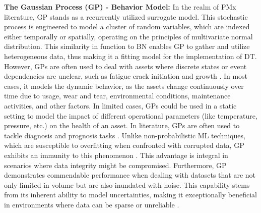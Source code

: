 \documentclass[runningheads]{llncs}
\begin{document}
\textbf{The Gaussian Process (GP) - Behavior Model:} In the realm of PMx literature, GP stands as a recurrently utilized surrogate model. This stochastic process is engineered to model a cluster of random variables, which are indexed either temporally or spatially, operating on the principles of multivariate normal distribution. This similarity in function to BN enables GP to gather and utilize heterogeneous data, thus making it a fitting model for the implementation of DT. However, GPs are often used to deal with assets where discrete states or event dependencies are unclear, such as fatigue crack initiation and growth \cite{fang2022fatigue}. In most cases, it models the dynamic behavior, as the assets change continuously over time due to usage, wear and tear, environmental conditions, maintenance activities, and other factors. In limited cases, GPs could be used in a static setting to model the impact of different operational parameters (like temperature, pressure, etc.) on the health of an asset. In literature, GPs are often used to tackle diagnosis and prognosis tasks \cite{chakraborty2021role}. Unlike non-probabilistic ML techniques, which are susceptible to overfitting when confronted with corrupted data, GP exhibits an immunity to this phenomenon \cite{chakraborty2021role}. This advantage is integral in scenarios where data integrity might be compromised. Furthermore, GP demonstrates commendable performance when dealing with datasets that are not only limited in volume but are also inundated with noise. This capability stems from its inherent ability to model uncertainties, making it exceptionally beneficial in environments where data can be sparse or unreliable \cite{karve2020digital}.\\
\end{document}
